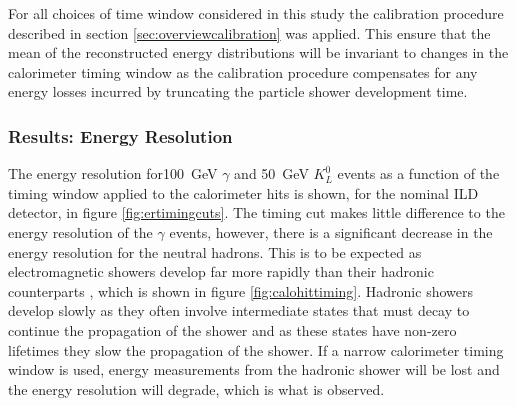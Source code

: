 For all choices of time window considered in this study the calibration procedure described in section \ref{sec:overviewcalibration} was applied.  This ensure that the mean of the reconstructed energy distributions will be invariant to changes in the calorimeter timing window as the calibration procedure compensates for any energy losses incurred by truncating the particle shower development time.  


\subsubsection{Results: Energy Resolution}
The energy resolution for100~GeV $\gamma$ and 50~GeV $K^{0}_{L}$ events as a function of the timing window applied to the calorimeter hits is shown, for the nominal ILD detector, in figure \ref{fig:ertimingcuts}.  The timing cut makes little difference to the energy resolution of the $\gamma$ events, however, there is a significant decrease in the energy resolution for the neutral hadrons.  This is to be expected as electromagnetic showers develop far more rapidly than their hadronic counterparts \cite{Wigmans:2000vf}, which is shown in figure \ref{fig:calohittiming}.  Hadronic showers develop slowly as they often involve intermediate states that must decay to continue the propagation of the shower and as these states have non-zero lifetimes they slow the propagation of the shower.  If a narrow calorimeter timing window is used, energy measurements from the hadronic shower will be lost and the energy resolution will degrade, which is what is observed.  

